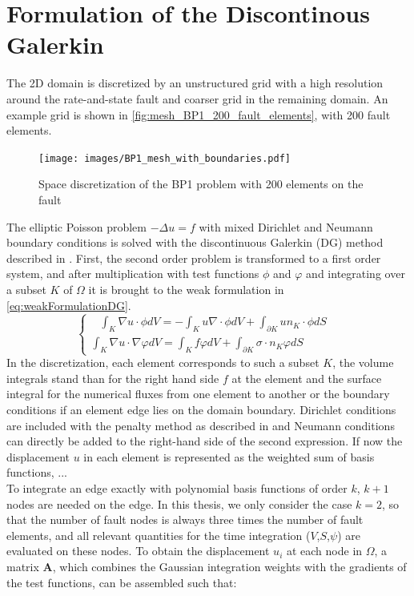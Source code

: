 \section{Formulation of the Discontinous Galerkin}
The 2D domain is discretized by an unstructured grid with a high resolution around the rate-and-state fault and coarser grid in the remaining domain. An example grid is shown in \autoref{fig:mesh_BP1_200_fault_elements}, with 200 fault elements.

\begin{figure}[H]
	\centering
	\texttt{[image: images/BP1\_mesh\_with\_boundaries.pdf]}
	\caption{Space discretization of the BP1 problem with 200 elements on the fault}
	\label{fig:mesh_BP1_200_fault_elements}
\end{figure}

The elliptic Poisson problem $-\Delta u = f$ with mixed Dirichlet and Neumann boundary conditions is solved with the discontinuous Galerkin (DG) method described in \cite{DG-quick-tutorial}. First, the second order problem is transformed to a first order system, and after multiplication with test functions $\phi$ and $\varphi$ and integrating over a subset $K$ of $\Omega$ it is brought to the weak formulation in \autoref{eq:weakFormulationDG}. 
\begin{equation}
	\label{eq:weakFormulationDG}
	\begin{cases}
		\;\;\ \int_K\nabla u\cdot\phi dV = -\int_Ku\nabla\cdot\phi dV + \int_{\partial K} u n_K\cdot\phi dS &\\
		\int_K\nabla u\cdot\nabla\varphi dV = \int_Kf\varphi dV + \int_{\partial K} \sigma\cdot n_K\varphi dS &
	\end{cases}
\end{equation} 
In the discretization, each element corresponds to such a subset $K$, the volume integrals stand than for the right hand side $f$ at the element and the surface integral for the numerical fluxes from one element to another or the boundary conditions if an element edge lies on the domain boundary. Dirichlet conditions are included with the penalty method as described in \cite{DG-elliptic-problems} and Neumann conditions can directly be added to the right-hand side of the second expression. If now the displacement $u$ in each element is represented as the weighted sum of basis functions, ... \\
To integrate an edge exactly with polynomial basis functions of order $k$, $k+1$ nodes are needed on the edge. In this thesis, we only consider the case $k=2$, so that the number of fault nodes is always three times the number of fault elements, and all relevant quantities for the time integration ($V$,$S$,$\psi$) are evaluated on these nodes. To obtain the displacement $u_i$ at each node in $\Omega$, a matrix $\mathbf{A}$, which combines the Gaussian integration weights with the gradients of the test functions, can be assembled such that:
